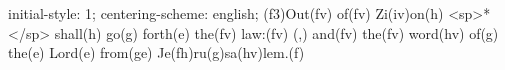initial-style: 1;
centering-scheme: english;
(f3)Out(fv) of(fv) Zi(iv)on(h) <sp>*</sp> shall(h) go(g) forth(e) the(fv) law:(fv) (,) and(fv) the(fv) word(hv) of(g) the(e) Lord(e) from(ge) Je(fh)ru(g)sa(hv)lem.(f)

